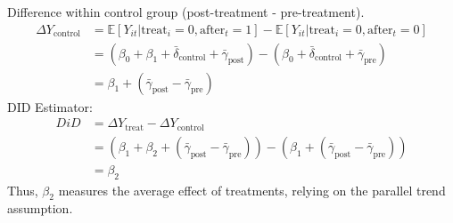 Difference within control group (post-treatment - pre-treatment).
\begin{align*}
    \Delta Y_{\text{control}} &= \mathbb{E}[Y_{it} | \text{treat}_i=0, \text{after}_t=1] - \mathbb{E}[Y_{it} | \text{treat}_i=0, \text{after}_t=0] \\
    &= (\beta_0 + \beta_1 + \bar{\delta}_{\text{control}} + \bar{\gamma}_{\text{post}}) - (\beta_0 + \bar{\delta}_{\text{control}} + \bar{\gamma}_{\text{pre}}) \\
    &= \beta_1 + (\bar{\gamma}_{\text{post}} - \bar{\gamma}_{\text{pre}})
\end{align*}
DID Estimator:
\begin{align*}
    DiD &= \Delta Y_{\text{treat}} - \Delta Y_{\text{control}} \\
    &= (\beta_1 + \beta_2 + (\bar{\gamma}_{\text{post}} - \bar{\gamma}_{\text{pre}})) - (\beta_1 + (\bar{\gamma}_{\text{post}} - \bar{\gamma}_{\text{pre}})) \\
    &= \beta_2
\end{align*}
Thus, $\beta_2$ measures the average effect of treatments, relying on the parallel trend assumption.

